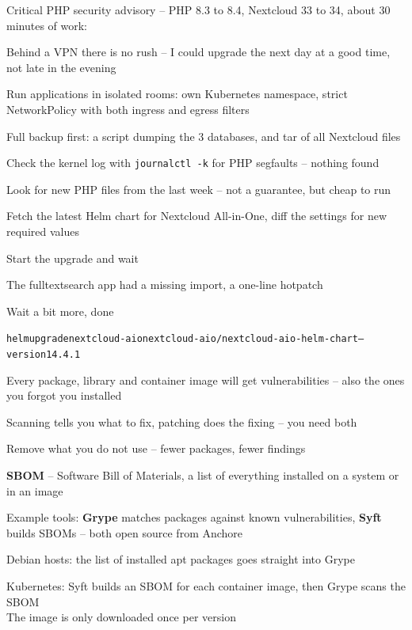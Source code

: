 \documentclass[Screen16to9,17pt]{foils}
\begin{document}
Critical PHP security advisory -- PHP 8.3 to 8.4, Nextcloud 33 to 34, about 30 minutes of work:
\begin{list2}
\item Behind a VPN there is no rush -- I could upgrade the next day at a good time, not late in the evening
\item Run applications in isolated rooms: own Kubernetes namespace, strict NetworkPolicy with both ingress and egress filters
\item Full backup first: a script dumping the 3 databases, and tar of all Nextcloud files
\item Check the kernel log with \verb+journalctl -k+ for PHP segfaults -- nothing found
\item Look for new PHP files from the last week -- not a guarantee, but cheap to run
\item Fetch the latest Helm chart for Nextcloud All-in-One, diff the settings for new required values
\item Start the upgrade and wait
\item The fulltextsearch app had a missing import, a one-line hotpatch\\
\item Wait a bit more, done
\end{list2}

\begin{alltt}\footnotesize
helm upgrade nextcloud-aio nextcloud-aio/nextcloud-aio-helm-chart --version 14.4.1
\end{alltt}


\begin{list2}
\item Every package, library and container image will get vulnerabilities -- also the ones you forgot you installed
\item Scanning tells you what to fix, patching does the fixing -- you need both
\item Remove what you do not use -- fewer packages, fewer findings
\item {\bf SBOM} -- Software Bill of Materials, a list of everything installed on a system or in an image
\item Example tools: {\bf Grype} matches packages against known vulnerabilities, {\bf Syft} builds SBOMs -- both open source from Anchore\\
\item Debian hosts: the list of installed apt packages goes straight into Grype
\item Kubernetes: Syft builds an SBOM for each container image, then Grype scans the SBOM\\
The image is only downloaded once per version
\end{list2}
\end{document}
